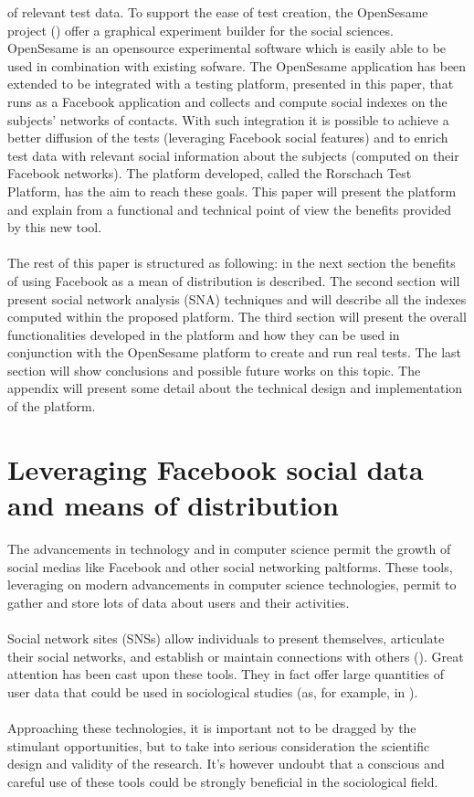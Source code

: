 of relevant test data.
To support the ease of test creation, the OpenSesame project (\cite{Matot-2011}) offer a graphical experiment builder for the social sciences.
OpenSesame is an opensource experimental software which is easily able to be used in combination with existing sofware.
The OpenSesame application has been extended to be integrated with a testing platform, presented in this paper, that runs as a Facebook application and collects and compute
social indexes on the subjects’ networks of contacts.
With such integration it is possible to achieve a better diffusion of the tests (leveraging Facebook social features) and to enrich test data with relevant social
information about the subjects (computed on their Facebook networks).
The platform developed, called the Rorschach Test Platform, has the aim to reach these goals.
This paper will present the platform and explain from a functional and technical point of view the beneﬁts provided by this new tool.\\
\\
The rest of this paper is structured as following: in the next section the beneﬁts of using Facebook as a mean of distribution is described.
The second section will present social network analysis (SNA) techniques and will describe all the indexes computed within the proposed platform.
The third section will present the overall functionalities developed in the platform and how they can be used in conjunction with the OpenSesame platform to create
and run real tests.
The last section will show conclusions and possible future works on this topic.
The appendix will present some detail about the technical design and implementation of the platform.

\section{Leveraging Facebook social data and means of distribution}
The advancements in technology and in computer science permit the growth of social medias like Facebook and other social networking paltforms.
These tools, leveraging on modern advancements in computer science technologies, permit to gather and store lots of data about users and their activities.\\
\\
Social network sites (SNSs) allow individuals to present themselves, articulate their social networks, and establish or maintain connections with others
(\cite{Boyd-2007}).
Great attention has been cast upon these tools.
They in fact offer large quantities of user data that could be used in sociological studies (as, for example, in \cite{Ellison-2007}).\\
\\
Approaching these technologies, it is important not to be dragged by the stimulant opportunities, but to take into serious consideration the scientiﬁc design and
validity of the research.
It’s however undoubt that a conscious and careful use of these tools could be strongly beneﬁcial in the sociological ﬁeld.\\
\\
